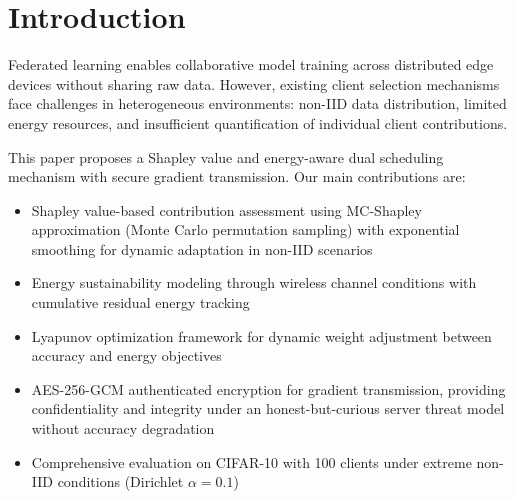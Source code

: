 \section{Introduction}

Federated learning enables collaborative model training across distributed edge devices without sharing raw data. However, existing client selection mechanisms face challenges in heterogeneous environments: non-IID data distribution, limited energy resources, and insufficient quantification of individual client contributions.

This paper proposes a Shapley value and energy-aware dual scheduling mechanism with secure gradient transmission. Our main contributions are:

\begin{itemize}
\item Shapley value-based contribution assessment using MC-Shapley approximation (Monte Carlo permutation sampling) with exponential smoothing for dynamic adaptation in non-IID scenarios
\item Energy sustainability modeling through wireless channel conditions with cumulative residual energy tracking
\item Lyapunov optimization framework for dynamic weight adjustment between accuracy and energy objectives
\item AES-256-GCM authenticated encryption for gradient transmission, providing confidentiality and integrity under an honest-but-curious server threat model without accuracy degradation
\item Comprehensive evaluation on CIFAR-10 with 100 clients under extreme non-IID conditions (Dirichlet $\alpha=0.1$)
\end{itemize}
